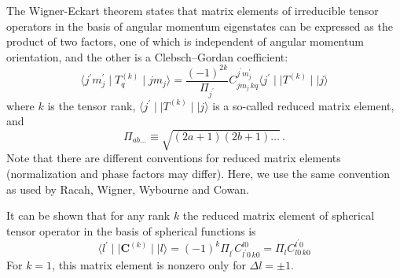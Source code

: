 \documentclass[a4paper,oneside,12pt]{extarticle}
\begin{document}
The Wigner-Eckart theorem states that matrix elements of irreducible tensor operators in the basis of angular momentum eigenstates can be expressed as the product of two factors, one of which is independent of angular momentum orientation, and the other is a Clebsch–Gordan coefficient:
%
\begin{equation}
\langle j^{\prime} m_j^{\prime} \mid T^{(k)}_q \mid j m_j \rangle = 
\frac{(-1)^{2k}}{\Pi_{j^{\prime}}}
C_{j m_j \, k q}^{j^{\prime} m_j^{\prime}}
\langle j^{\prime} \mid\mid T^{(k)} \mid\mid j \rangle
\label{eq:WE}
\end{equation}
%
where $k$ is the tensor rank, $\langle j^{\prime} \mid\mid T^{(k)} \mid\mid j \rangle$ is a so-called reduced matrix element, and
$$\Pi_{ab\ldots}\equiv\sqrt{(2a+1)(2b+1)\ldots} \,.$$
%
Note that there are different conventions for reduced matrix elements (normalization and phase factors may differ). Here, we use the same convention as used by Racah, Wigner, Wybourne and Cowan.

It can be shown that for any rank $k$ the reduced matrix element of spherical tensor operator in the basis of spherical functions is
\begin{equation}
\langle l^{\prime} \mid\mid \mathbf{C}^{(k)} \mid\mid l \rangle = 
(-1)^k \Pi_{l^{\prime}} C_{l^{\prime} 0 \, k 0}^{l 0} = \Pi_{l} C_{l 0 \, k 0}^{l^{\prime} 0}
\label{eq:lCl}
\end{equation}
For $k=1$, this matrix element is nonzero only for $\Delta l=\pm 1$.
\end{document}

